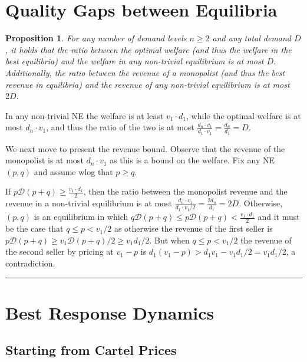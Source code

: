 \documentclass[11pt,a4paper]{article}
\newcommand{\qed}{\rule{1.5mm}{2mm}\vspace{0.1in}}
\newenvironment{proof}{\par\noindent{\bf Proof:}}{\qed}
\newtheorem{proposition}[theorem]{Proposition}
\begin{document}
\section{Quality Gaps between Equilibria}
\label{app:gaps-between-eq-tight}
\begin{proposition}\label{prop:POA-D}
	For any number of demand levels $n\geq 2$ and any total demand $D$, it holds that the ratio between the optimal welfare (and thus the welfare in the best equilibria) and the welfare in any non-trivial equilibrium is at most $D$.
	Additionally, the ratio between the revenue of a monopolist (and thus the best revenue in equilibria) and the revenue of any non-trivial equilibrium is at most $2D$.    	
\end{proposition}
\begin{proof}
	In any non-trivial NE the welfare is at least $v_1\cdot d_1$,
		while the optimal welfare is at most $d_n \cdot v_1$,
		and thus the ratio of the two is at most %
		$\frac{d_n\cdot v_1}{d_1\cdot v_1}= \frac{d_n}{d_1}=D$. %
	
	We next move to present the revenue bound. Observe that the revenue of the monopolist is at most $d_n\cdot v_1$ as this is a bound on the welfare. Fix any NE $(p,q)$ and assume wlog that $p\geq q$.
	
	If $p \mathcal{D}(p+q)\geq \frac{v_1\cdot d_1}{2}$, then the ratio between the monopolist revenue and the revenue in a non-trivial equilibrium is at most %
	$\frac{d_n\cdot v_1}{d_1\cdot v_1/2}= \frac{2d_n}{d_1}= 2D$.
	Otherwise, $(p,q)$ is an equilibrium in which $q \mathcal{D}(p+q)\leq p \mathcal{D}(p+q)< \frac{v_1\cdot d_1}{2}$ and it must be the case that $q\leq p<v_1/2$ as otherwise the revenue of the first seller is $p \mathcal{D}(p+q)\geq v_1 \mathcal{D}(p+q)/2 \geq v_1 d_1/2$. But when
$q\leq p<v_1/2$ the revenue of the second seller by pricing at $v_1-p$ is $d_1 (v_1-p) > d_1 v_1 - v_1 d_1 /2 = v_1 d_1 /2 $, a contradiction.
\end{proof}

\section{Best Response Dynamics}

\subsection{Starting from Cartel Prices}
\label{app:cartel-prices-two-levels}
\end{document}
